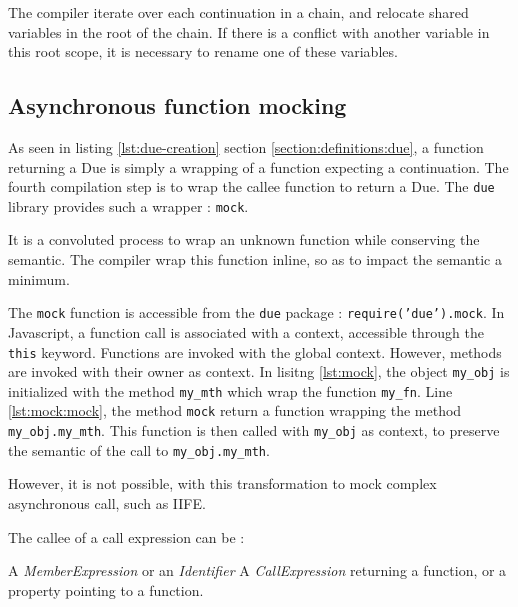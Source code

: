 The compiler iterate over each continuation in a chain, and  relocate shared variables in the root of the chain.
If there is a conflict with another variable in this root scope, it is necessary to rename one of these variables.

\subsection{Asynchronous function mocking} \label{section:limits:mock}

As seen in listing \ref{lst:due-creation} section \ref{section:definitions:due}, a function returning a Due is simply a wrapping of a function expecting a continuation.
The fourth compilation step is to wrap the callee function to return a Due.
The \texttt{due} library provides such a wrapper : \texttt{mock}.

It is a convoluted process to wrap an unknown function while conserving the semantic.
The compiler wrap this function inline, so as to impact the semantic a minimum.

The \texttt{mock} function is accessible from the \texttt{due} package : \texttt{require('due').mock}.
In Javascript, a function call is associated with a context, accessible through the \texttt{this} keyword.
Functions are invoked with the global context.
However, methods are invoked with their owner as context.
In lisitng \ref{lst:mock}, the object \texttt{my_obj} is initialized with the method \texttt{my_mth} which wrap the function \texttt{my_fn}.
Line \ref{lst:mock:mock}, the method \texttt{mock} return a function wrapping the method \texttt{my_obj.my_mth}.
This function is then called with \texttt{my_obj} as context, to preserve the semantic of the call to \texttt{my_obj.my_mth}.

However, it is not possible, with this transformation to mock complex asynchronous call, such as IIFE.

The callee of a call expression can be :

A \textit{MemberExpression} or an \textit{Identifier}
A \textit{CallExpression} returning a function, or a property pointing to a function.

